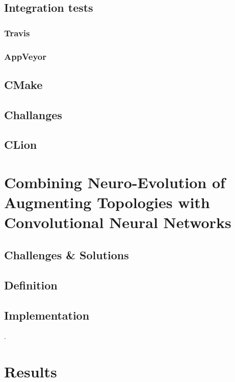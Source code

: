 \documentclass[11pt]{article}
\begin{document}
		\subsection{Integration tests}
			
			\subsubsection{Travis}
				
			\subsubsection{AppVeyor}
				
		\subsection{CMake}
			
		\subsection{Challanges}
			\subsection{CLion}
				
	\newpage

	\section{Combining Neuro-Evolution of Augmenting Topologies with Convolutional Neural Networks}
		\subsection{Challenges \& Solutions}
			
		\subsection{Definition}
			
		\subsection{Implementation}
			.
	\newpage

	\section{Results}
\end{document}
